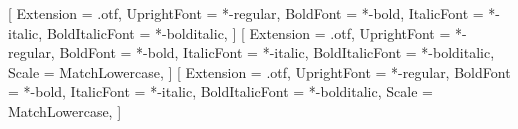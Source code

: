 %
\setmainfont{texgyrepagella}[
  Extension      = .otf,
  UprightFont    = *-regular,
  BoldFont       = *-bold,
  ItalicFont     = *-italic,
  BoldItalicFont = *-bolditalic,
]
\setsansfont{texgyreheros}[
  Extension      = .otf,
  UprightFont    = *-regular,
  BoldFont       = *-bold,
  ItalicFont     = *-italic,
  BoldItalicFont = *-bolditalic,
  Scale          = MatchLowercase,
]
\setmonofont{texgyrecursor}[
  Extension      = .otf,
  UprightFont    = *-regular,
  BoldFont       = *-bold,
  ItalicFont     = *-italic,
  BoldItalicFont = *-bolditalic,
  Scale          = MatchLowercase,
]

\usepackage{unicode-math}

\usepackage{microtype}   %
